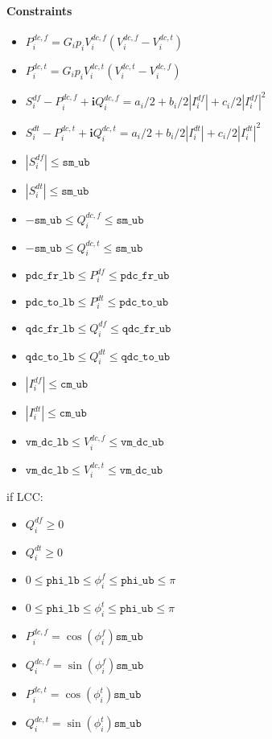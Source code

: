 \documentclass{article}
\begin{document}
\paragraph{Constraints}
\begin{itemize}
    \item $P^{dc,f}_i = G_i p_i V^{dc,f}_i(V^{dc,f}_i -  V^{dc,t}_i)$
    \item $P^{dc,t}_i = G_i p_i V^{dc,t}_i(V^{dc,t}_i -  V^{dc,f}_i)$
    \item $S^{df}_i - P^{dc,f}_i+  \bm i Q^{dc,f}_i = a_i/2 + b_i/2|I^{df}_i| + c_i/2 |I^{df}_i|^2$
    \item $S^{dt}_i - P^{dc,t}_i +  \bm i  Q^{dc,t}_i = a_i/2 + b_i/2|I^{dt}_i| + c_i/2 |I^{dt}_i|^2$ 
    \item $|S^{df}_i| \leq \texttt{sm\_ub}$
    \item $|S^{dt}_i| \leq \texttt{sm\_ub}$
    \item $-\texttt{sm\_ub} \leq Q^{dc,f}_i \leq \texttt{sm\_ub}$
    \item $-\texttt{sm\_ub} \leq Q^{dc,t}_i \leq \texttt{sm\_ub}$
    \item $\texttt{pdc\_fr\_lb} \leq P^{df}_i \leq \texttt{pdc\_fr\_ub}$
    \item $\texttt{pdc\_to\_lb} \leq P^{dt}_i \leq \texttt{pdc\_to\_ub}$
    \item $\texttt{qdc\_fr\_lb} \leq Q^{df}_i \leq \texttt{qdc\_fr\_ub}$
    \item $\texttt{qdc\_to\_lb} \leq Q^{dt}_i \leq \texttt{qdc\_to\_ub}$
    \item $|I^{df}_i| \leq \texttt{cm\_ub}$
    \item $|I^{dt}_i| \leq \texttt{cm\_ub}$
    \item $\texttt{vm\_dc\_lb} \leq V^{dc,f}_i \leq \texttt{vm\_dc\_ub}$
    \item $\texttt{vm\_dc\_lb} \leq V^{dc,t}_i \leq \texttt{vm\_dc\_ub}$
\end{itemize}

if LCC:
\begin{itemize}
    \item $Q^{df}_i \geq 0$
    \item $Q^{dt}_i \geq 0$
    \item $0 \leq \texttt{phi\_lb} \leq \phi^{f}_i \leq \texttt{phi\_ub} \leq \pi$
    \item $0 \leq \texttt{phi\_lb} \leq \phi^{t}_i \leq \texttt{phi\_ub} \leq \pi$
    \item $P^{dc,f}_i = \cos ( \phi^{f}_i ) \texttt{sm\_ub} $
    \item $Q^{dc,f}_i = \sin ( \phi^{f}_i ) \texttt{sm\_ub} $
    \item $P^{dc,t}_i = \cos ( \phi^{t}_i ) \texttt{sm\_ub} $
    \item $Q^{dc,t}_i = \sin ( \phi^{t}_i ) \texttt{sm\_ub} $
\end{itemize}
\end{document}
